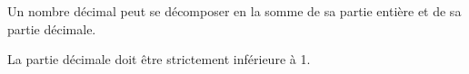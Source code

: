 Un nombre décimal peut se décomposer en la somme de sa partie entière et de
sa partie décimale.\par La partie décimale doit être strictement inférieure à 1. 